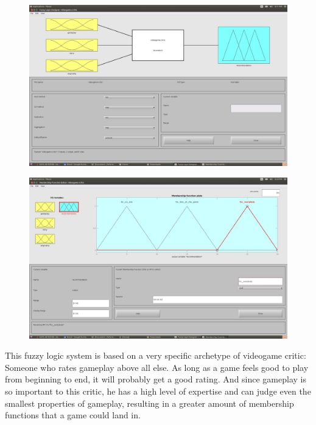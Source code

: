 \documentclass[a4paper, 11pt]{article}
\begin{document}
\begin{figure}[ht]
\includegraphics[scale=0.15]{vg-mf-sum.jpg}
\end{figure}

\begin{figure}[ht]
\includegraphics[scale=0.15]{vg-mf-out.jpg}
\end{figure}

\newpage

This fuzzy logic system is based on a very specific archetype of videogame critic: Someone who rates gameplay above all else. As long as a game feels good to play from beginning to end, it will probably get a good rating. And since gameplay is so important to this critic, he has a high level of expertise and can judge even the smallest properties of gameplay, resulting in a greater amount of membership functions that a game could land in. 
\end{document}
